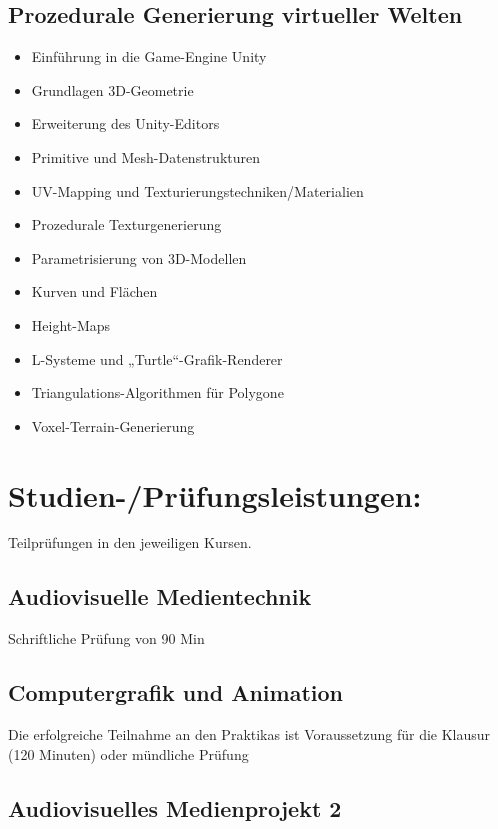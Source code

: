 \subsection{Prozedurale Generierung virtueller
Welten}\label{prozedurale-generierung-virtueller-welten-1}

\begin{itemize}
\tightlist
\item
  Einführung in die Game-Engine Unity
\item
  Grundlagen 3D-Geometrie
\item
  Erweiterung des Unity-Editors
\item
  Primitive und Mesh-Datenstrukturen
\item
  UV-Mapping und Texturierungstechniken/Materialien
\item
  Prozedurale Texturgenerierung
\item
  Parametrisierung von 3D-Modellen
\item
  Kurven und Flächen
\item
  Height-Maps
\item
  L-Systeme und „Turtle``-Grafik-Renderer
\item
  Triangulations-Algorithmen für Polygone
\item
  Voxel-Terrain-Generierung
\end{itemize}

\section{Studien-/Prüfungsleistungen:}\label{studien-pruxfcfungsleistungen-29}

Teilprüfungen in den jeweiligen Kursen.

\subsection{Audiovisuelle
Medientechnik}\label{audiovisuelle-medientechnik-2}

Schriftliche Prüfung von 90 Min

\subsection{Computergrafik und
Animation}\label{computergrafik-und-animation-2}

Die erfolgreiche Teilnahme an den Praktikas ist Voraussetzung für die
Klausur (120 Minuten) oder mündliche Prüfung

\subsection{Audiovisuelles Medienprojekt
2}\label{audiovisuelles-medienprojekt-2-2}

